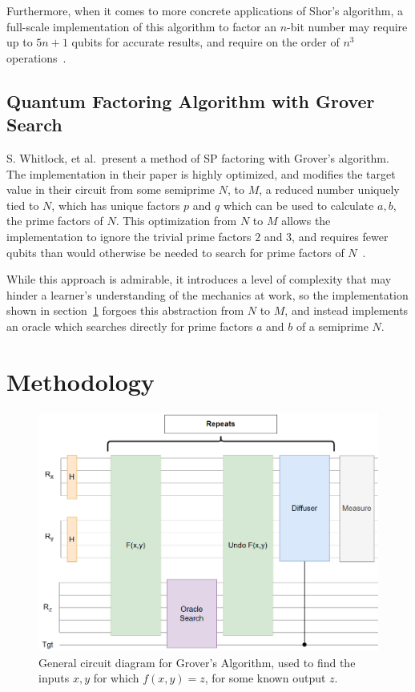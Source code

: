 \documentclass[twocolumn]{cinc}
\begin{document}
  Furthermore, when it comes to more concrete applications of Shor's algorithm,
  a full-scale implementation of this algorithm to factor an $n$-bit number
  may require up to $5n+1$ qubits for accurate results, and require 
  on the order of $n^3$ operations~\cite{quantum_fac_efficient}.

  \subsection{Quantum Factoring Algorithm with Grover Search}

  S. Whitlock, et al.\ present a method of SP factoring with Grover's
  algorithm. The implementation in their paper is highly optimized,
  and modifies the target value in their circuit from some semiprime $N$,
  to $M$, a reduced number uniquely tied to $N$, which has unique factors 
  $p$ and $q$ which can be used to calculate $a, b$, the prime factors of 
  $N$. This optimization from $N$ to $M$ allows the implementation to ignore
  the trivial prime factors $2$ and $3$, and requires fewer qubits than would
  otherwise be needed to search for prime factors of $N$~\cite{quantum_factoring}.

  While this approach is admirable, it introduces a level of complexity 
  that may hinder a learner's understanding of the mechanics at work,
  so the implementation shown in section\ \ref{sec:Methodology} forgoes
  this abstraction from $N$ to $M$, and instead implements an oracle which
  searches directly for prime factors $a$ and $b$ of a semiprime $N$.

\section{Methodology}\label{sec:Methodology}

\begin{figure}[!ht]\label{fig:FIGURA1}
\centering
\includegraphics[width=15.8cm]{grover_inversion.png}
\caption{General circuit diagram for Grover's Algorithm, used to find 
the inputs $x, y$ for which $f(x,y)=z$, for some known output $z$.}
\end{figure}
\end{document}
